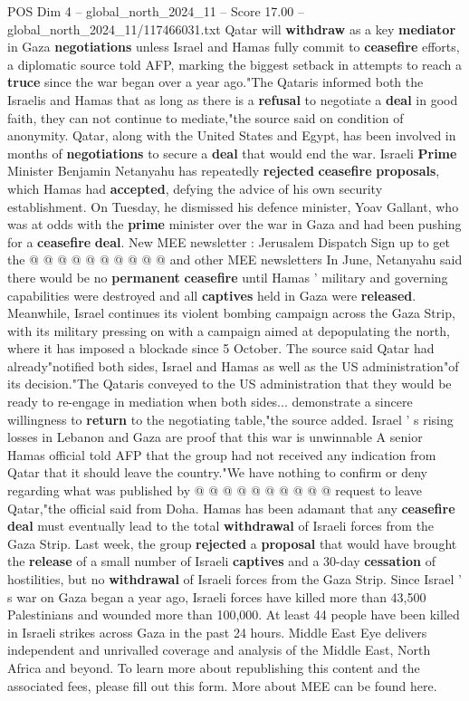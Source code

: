 \begin{textsample}{POS Dim 4 – global\_north\_2024\_11 – Score 17.00 – global\_north\_2024\_11/117466031.txt}  \label{ex:f4_pos_298}
Qatar will \textbf{withdraw} as a key \textbf{mediator} in Gaza \textbf{negotiations} unless Israel and Hamas fully commit to \textbf{ceasefire} efforts, a diplomatic source told AFP, marking the biggest setback in attempts to reach a \textbf{truce} since the war began over a year ago."The Qataris informed both the Israelis and Hamas that as long as there is a \textbf{refusal} to negotiate a \textbf{deal} in good faith, they can not continue to mediate,"the source said on condition of anonymity.
Qatar, along with the United States and Egypt, has been involved in months of \textbf{negotiations} to secure a \textbf{deal} that would end the war.
Israeli \textbf{Prime} Minister Benjamin Netanyahu has repeatedly \textbf{rejected} \textbf{ceasefire} \textbf{proposals}, which Hamas had \textbf{accepted}, defying the advice of his own security establishment.
On Tuesday, he dismissed his defence minister, Yoav Gallant, who was at odds with the \textbf{prime} minister over the war in Gaza and had been pushing for a \textbf{ceasefire} \textbf{deal}.
New MEE newsletter : Jerusalem Dispatch Sign up to get the @ @ @ @ @ @ @ @ @ @ and other MEE newsletters In June, Netanyahu said there would be no \textbf{permanent} \textbf{ceasefire} until Hamas ' military and governing capabilities were destroyed and all \textbf{captives} held in Gaza were \textbf{released}.
Meanwhile, Israel continues its violent bombing campaign across the Gaza Strip, with its military pressing on with a campaign aimed at depopulating the north, where it has imposed a blockade since 5 October.
The source said Qatar had already"notified both sides, Israel and Hamas as well as the US administration"of its decision."The Qataris conveyed to the US administration that they would be ready to re-engage in mediation when both sides... demonstrate a sincere willingness to \textbf{return} to the negotiating table,"the source added.
Israel ' s rising losses in Lebanon and Gaza are proof that this war is unwinnable A senior Hamas official told AFP that the group had not received any indication from Qatar that it should leave the country."We have nothing to confirm or deny regarding what was published by @ @ @ @ @ @ @ @ @ @ request to leave Qatar,"the official said from Doha.
Hamas has been adamant that any \textbf{ceasefire} \textbf{deal} must eventually lead to the total \textbf{withdrawal} of Israeli forces from the Gaza Strip.
Last week, the group \textbf{rejected} a \textbf{proposal} that would have brought the \textbf{release} of a small number of Israeli \textbf{captives} and a 30-day \textbf{cessation} of hostilities, but no \textbf{withdrawal} of Israeli forces from the Gaza Strip.
Since Israel ' s war on Gaza began a year ago, Israeli forces have killed more than 43,500 Palestinians and wounded more than 100,000.
At least 44 people have been killed in Israeli strikes across Gaza in the past 24 hours.
Middle East Eye delivers independent and unrivalled coverage and analysis of the Middle East, North Africa and beyond.
To learn more about republishing this content and the associated fees, please fill out this form.
More about MEE can be found here.


\end{textsample}
